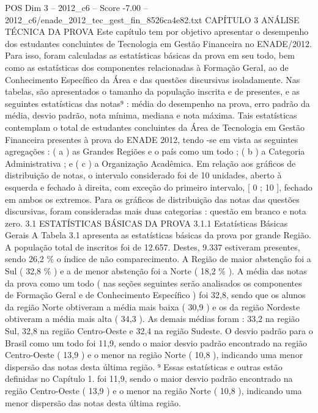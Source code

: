 \begin{textsample}{POS Dim 3 – 2012\_c6 – Score -7.00 – 2012\_c6/enade\_2012\_tec\_gest\_fin\_8526ca4e82.txt}  \label{ex:f3_pos_261}
CAPÍTULO 3 ANÁLISE TÉCNICA DA PROVA Este capítulo tem por objetivo apresentar o desempenho dos estudantes concluintes de Tecnologia em Gestão Financeira no ENADE/2012.
Para isso, foram calculadas as estatísticas básicas da prova em seu todo, bem como as estatísticas dos componentes relacionadas à Formação Geral, ao de Conhecimento Específico da Área e das questões discursivas isoladamente.
Nas tabelas, são apresentados o tamanho da população inscrita e de presentes, e as seguintes estatísticas das notas⁹ : média do desempenho na prova, erro padrão da média, desvio padrão, nota mínima, mediana e nota máxima.
Tais estatísticas contemplam o total de estudantes concluintes da Área de Tecnologia em Gestão Financeira presentes à prova do ENADE 2012, tendo -se em vista as seguintes agregações : ( a ) as Grandes Regiões e o país como um todo ; ( b ) a Categoria Administrativa ; e ( c ) a Organização Acadêmica.
Em relação aos gráficos de distribuição de notas, o intervalo considerado foi de 10 unidades, aberto à esquerda e fechado à direita, com exceção do primeiro intervalo, [ 0 ; 10 ], fechado em ambos os extremos.
Para os gráficos de distribuição das notas das questões discursivas, foram consideradas mais duas categorias : questão em branco e nota zero. 3.1 ESTATÍSTICAS BÁSICAS DA PROVA 3.1.1 Estatísticas Básicas Gerais A Tabela 3.1 apresenta as estatísticas básicas da prova por grande Região.
A população total de inscritos foi de 12.657.
Destes, 9.337 estiveram presentes, sendo 26,2 \% o índice de não comparecimento.
A Região de maior abstenção foi a Sul ( 32,8 \% ) e a de menor abstenção foi a Norte ( 18,2 \% ).
A média das notas da prova como um todo ( nas seções seguintes serão analisados os componentes de Formação Geral e de Conhecimento Específico ) foi 32,8, sendo que os alunos da região Norte obtiveram a média mais baixa ( 30,9 ) e os da região Nordeste obtiveram a média mais alta ( 34,3 ).
As demais médias foram : 33,2 na região Sul, 32,8 na região Centro-Oeste e 32,4 na região Sudeste.
O desvio padrão para o Brasil como um todo foi 11,9, sendo o maior desvio padrão encontrado na região Centro-Oeste ( 13,9 ) e o menor na região Norte ( 10,8 ), indicando uma menor dispersão das notas desta última região. ⁹ Essas estatísticas e outras estão definidas no Capítulo 1. foi 11,9, sendo o maior desvio padrão encontrado na região Centro-Oeste ( 13,9 ) e o menor na região Norte ( 10,8 ), indicando uma menor dispersão das notas desta última região.

\end{textsample}

